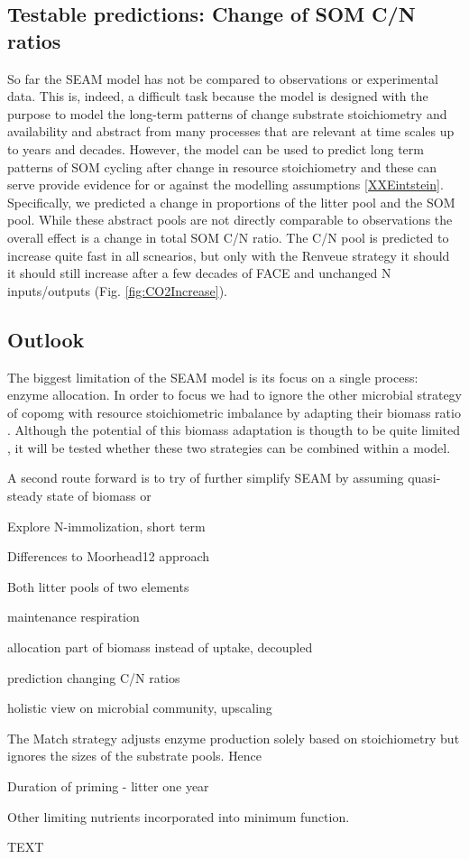 \subsection{Testable predictions: Change of SOM C/N ratios}
So far the SEAM model has not be compared to observations or experimental data.
This is, indeed, a difficult task because the model is designed with the purpose
to model the long-term patterns of change substrate stoichiometry and
availability and abstract from many processes that are relevant at time scales
up to years and decades.
However, the model can be used to predict long term patterns of SOM cycling
after change in resource stoichiometry and these can serve provide evidence for
or against the modelling assumptions \ref{XXEintstein}.
Specifically, we predicted a change in proportions of the litter pool and the
SOM pool. While these abstract pools are not directly comparable to observations
the overall effect is a change in total SOM C/N ratio. The C/N pool is
predicted to increase quite fast in all scnearios, but only with
the Renveue strategy it should it should still increase after a few decades of
FACE and unchanged N inputs/outputs (Fig. \ref{fig:CO2Increase}).
 
\subsection{Outlook}
The biggest limitation of the SEAM model is its focus on a single
process: enzyme allocation. In order to focus we had to ignore the other
microbial strategy of copomg with resource stoichiometric imbalance by adapting their
biomass ratio \citep{XXRastetter}. Although the potential of this biomass
adaptation is thougth to be quite limited \citep{Mooshammer14}, it will be
tested whether these two strategies can be combined within a model.  

A second route forward is to try of further simplify SEAM by assuming
quasi-steady state of biomass or 

Explore N-immolization, short term





 




 
 
 

Differences to Moorhead12 approach

Both litter pools of two elements

maintenance respiration

allocation part of biomass instead of uptake, decoupled

prediction changing C/N ratios

holistic view on microbial community, upscaling


The Match strategy adjusts enzyme production solely based on stoichiometry but
ignores the sizes of the substrate pools. Hence

Duration of priming - litter one year

Other limiting nutrients incorporated into minimum function.


\conclusions  %
TEXT

